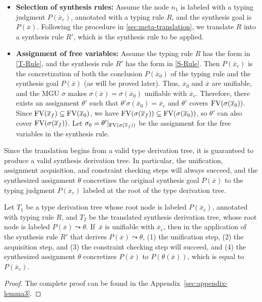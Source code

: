 \begin{itemize}
  \item \textbf{Selection of synthesis rules:}  
  Assume the node $n_1$ is labeled with a typing judgment $P(\overline{x}_c)$, annotated with a typing rule $R$, and the synthesis goal is $P(\overline{x})$. Following the procedure in \autoref{sec:meta-translation}, we translate $R$ into a synthesis rule $R'$, which is the synthesis rule to be applied.
  
  \item \textbf{Assignment of free variables:}  
    Assume the typing rule $R$ has the form in \autoref{T-Rule}, and the synthesis rule $R'$ has the form in \autoref{S-Rule}. 
    Then $P(\overline{x}_c)$ is the concretization of both the conclusion $P(\overline{x}_0)$ of the typing rule and the synthesis goal $P(\overline{x})$ (as will be proved later). 
    Thus, $\overline{x}_0$ and $\overline{x}$ are unifiable, and the MGU $\sigma$ makes $\sigma(\overline{x}) = \sigma(\overline{x}_0)$ unifiable with $\overline{x}_c$. Therefore, there exists an assignment $\theta'$ such that $\theta'\sigma(\overline{x}_0) = \overline{x}_c$ and $\theta'$ covers $\text{FV}(\sigma(\overline{x}_0))$. Since $\text{FV}(\overline{x}_f) \subseteq \text{FV}(\overline{x}_0)$, we have $\text{FV}(\sigma(\overline{x}_f)) \subseteq \text{FV}(\sigma(\overline{x}_0))$, so $\theta'$ can also cover $\text{FV}(\sigma(\overline{x}_f))$. Let $\sigma_0 = \theta'|_{\text{FV}(\sigma(\overline{x}_f))}$ be the assignment for the free variables in the synthesis rule.
\end{itemize}

Since the translation begins from a valid type derivation tree, it is guaranteed to produce a valid synthesis derivation tree. In particular, the unification, assignment acquisition, and constraint checking steps will always succeed, and the synthesized assignment $\theta$ concretizes the original synthesis goal $P(\overline{x})$ to the typing judgment $P(\overline{x}_c)$ labeled at the root of the type derivation tree.

\begin{lemma}
\label{lemma:translation}
Let $T_1$ be a type derivation tree whose root node is labeled $P(\overline{x}_c)$, annotated with typing rule $R$, and $T_2$ be the translated synthesis derivation tree, whose root node is labeled $P(\overline{x}) \leadsto \theta$.
If $\,\overline{x}$ is unifiable with $\overline{x}_c$, then in the application of the synthesis rule $R'$ that derives $P(\overline{x}) \leadsto \theta$, (1) the unification step, (2) the acquisition step, and (3) the constraint checking step will succeed, and (4) the synthesized assignment $\theta$ concretizes $P(\overline{x})$ to $P(\theta(\overline{x}))$, which is equal to $P(\overline{x}_c)$.
\end{lemma}
\begin{proof}
  The complete proof can be found in the Appendix~\ref{sec:appendix-lemma3}.
\end{proof}

